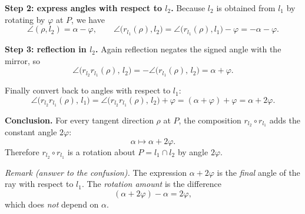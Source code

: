 \documentclass[12pt,a4paper]{article}
\theoremstyle{plain}
\theoremstyle{definition}      %
\begin{document}
\medskip
\noindent\textbf{Step 2: express angles with respect to $l_2$.}
Because $l_2$ is obtained from $l_1$ by rotating by $\varphi$ at $P$, we have
\[
\angle(\rho,l_2)=\alpha-\varphi,
\qquad
\angle\!\bigl(r_{l_1}(\rho),l_2\bigr)
=\angle\!\bigl(r_{l_1}(\rho),l_1\bigr)-\varphi
=-\alpha-\varphi.
\]

\medskip
\noindent\textbf{Step 3: reflection in $l_2$.}
Again reflection negates the signed angle with the mirror, so
\[
\angle\!\bigl(r_{l_2}r_{l_1}(\rho),\,l_2\bigr)
=
-\angle\!\bigl(r_{l_1}(\rho),\,l_2\bigr)
=
\alpha+\varphi.
\]

Finally convert back to angles with respect to $l_1$:
\[
\angle\!\bigl(r_{l_2}r_{l_1}(\rho),\,l_1\bigr)
=
\angle\!\bigl(r_{l_2}r_{l_1}(\rho),\,l_2\bigr)
+\varphi
=
(\alpha+\varphi)+\varphi
=
\alpha+2\varphi.
\]

\medskip
\noindent\textbf{Conclusion.}
For every tangent direction $\rho$ at $P$, the composition $r_{l_2}\circ r_{l_1}$
adds the constant angle $2\varphi$:
\[
\alpha \longmapsto \alpha+2\varphi.
\]
Therefore $r_{l_2}\circ r_{l_1}$ is a rotation about $P=l_1\cap l_2$ by angle $2\varphi$.

\medskip
\noindent\emph{Remark (answer to the confusion).}
The expression $\alpha+2\varphi$ is the \emph{final} angle of the ray with respect to $l_1$.
The \emph{rotation amount} is the difference
\[
(\alpha+2\varphi)-\alpha=2\varphi,
\]
which does \emph{not} depend on $\alpha$.







	
	
\end{document}
